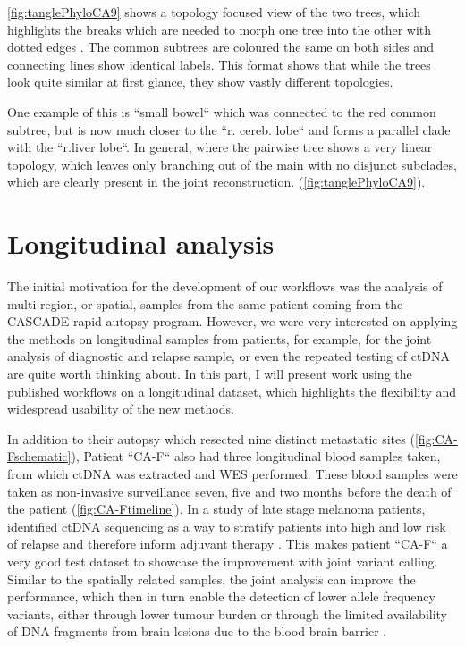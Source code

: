 \autoref{fig:tanglePhyloCA9} shows a topology focused view of the two trees, which highlights the breaks which are needed to morph one tree into the other with dotted edges \cite{Vienne2018}. The common subtrees are coloured the same on both sides and connecting lines show identical labels. This format shows that while the trees look quite similar at first glance, they show vastly different topologies.


One example of this is ``small bowel`` which was connected to the red common subtree, but is now much closer to the ``r. cereb. lobe`` and forms a parallel clade with the ``r.liver lobe``. In general, where the pairwise tree shows a very linear topology, which leaves only branching out of the main with no disjunct subclades, which are clearly present in the joint reconstruction.  (\autoref{fig:tanglePhyloCA9}).


\section[Longitudinal analysis]{Longitudinal analysis}
\label{variantcalling-sec:longitudinal}

The initial motivation for the development of our workflows was the analysis of multi-region, or spatial, samples from the same patient coming from the CASCADE rapid autopsy program. However, we were very interested on applying the methods on longitudinal samples from patients, for example, for the joint analysis of diagnostic and relapse sample, or even the repeated testing of ctDNA are quite worth thinking about. In this part, I will present work using the published workflows on a longitudinal dataset, which highlights the flexibility and widespread usability of the new methods.

In addition to their autopsy which resected nine distinct metastatic sites (\autoref{fig:CA-Fschematic}), Patient ``CA-F`` also had three longitudinal blood samples taken, from which ctDNA was extracted and WES performed. These blood samples were taken as non-invasive surveillance seven, five and two months before the death of the patient (\autoref{fig:CA-Ftimeline}). In a study of late stage melanoma patients,  identified ctDNA sequencing as a way to stratify patients into high and low risk of relapse and therefore inform adjuvant therapy \cite{Tan2019}. This makes patient ``CA-F`` a very good test dataset to showcase the improvement with joint variant calling. Similar to the spatially related samples, the joint analysis can improve the performance, which then in turn enable the detection of lower allele frequency variants, either through lower tumour burden or through the limited availability of DNA fragments from brain lesions due to the blood brain barrier \cite{2014}.

